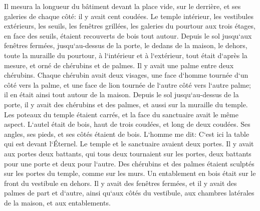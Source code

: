 \verse Il mesura la longueur du bâtiment devant la place vide, sur le derrière, et ses galeries de chaque côté: il y avait cent coudées. 
\verse Le temple intérieur, les vestibules extérieurs, les seuils, les fenêtres grillées, les galeries du pourtour aux trois étages, en face des seuils, étaient recouverts de bois tout autour. Depuis le sol jusqu`aux fenêtres fermées, 
\verse jusqu`au-dessus de la porte, le dedans de la maison, le dehors, toute la muraille du pourtour, à l`intérieur et à l`extérieur, tout était d`après la mesure, 
\verse et orné de chérubins et de palmes. Il y avait une palme entre deux chérubins. Chaque chérubin avait deux visages, 
\verse une face d`homme tournée d`un côté vers la palme, et une face de lion tournée de l`autre côté vers l`autre palme; il en était ainsi tout autour de la maison. 
\verse Depuis le sol jusqu`au-dessus de la porte, il y avait des chérubins et des palmes, et aussi sur la muraille du temple. 
\verse Les poteaux du temple étaient carrés, et la face du sanctuaire avait le même aspect. 
\verse L`autel était de bois, haut de trois coudées, et long de deux coudées. Ses angles, ses pieds, et ses côtés étaient de bois. L`homme me dit: C`est ici la table qui est devant l`Éternel. 
\verse Le temple et le sanctuaire avaient deux portes. 
\verse Il y avait aux portes deux battants, qui tous deux tournaient sur les portes, deux battants pour une porte et deux pour l`autre. 
\verse Des chérubins et des palmes étaient sculptés sur les portes du temple, comme sur les murs. Un entablement en bois était sur le front du vestibule en dehors. 
\verse Il y avait des fenêtres fermées, et il y avait des palmes de part et d`autre, ainsi qu`aux côtés du vestibule, aux chambres latérales de la maison, et aux entablements. 

\chapter{}

